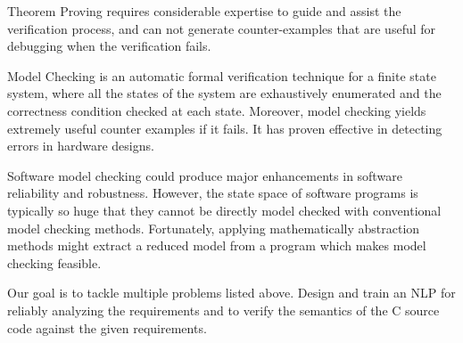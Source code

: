 \begin{multicols*}{2}
	Theorem Proving requires considerable expertise to guide and assist the verification process, and can not generate counter-examples that are useful for debugging when the verification fails.
	
	Model Checking \cite{Clarke:2000:MC:332656} is an automatic formal verification technique for a finite state system, where all the states of the system are exhaustively enumerated and the correctness condition checked at each state. Moreover, model checking yields extremely useful counter examples if it fails. It has proven effective in detecting errors in hardware designs.
	
	Software model checking could produce major enhancements in software reliability and robustness. However, the state space of software programs is typically so huge that they cannot be directly model checked with conventional model checking methods. Fortunately, applying mathematically abstraction methods might extract a reduced model from a program which makes model checking feasible.
	
	Our goal is to tackle multiple problems listed above. Design and train an \gls{NLP} for reliably analyzing the requirements and to verify the semantics of the C source code against the given requirements.
	
\end{multicols*}

